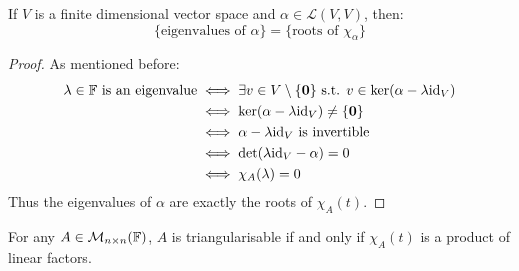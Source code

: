\documentclass[../main.tex]{subfiles}
\begin{document}
\begin{lemma}
  If $V$ is a finite dimensional vector space and $\alpha \in \mathcal{L}(V, V)$, then: \label{eValRoots}
  \[
    \{\text{eigenvalues of $\alpha$}\} = \{\text{roots of $\chi_{\alpha}$}\}
  \]
\end{lemma}
\begin{proof}
  As mentioned before:
  \begin{align*}
    \lambda \in \mathbb{F} \text{ is an eigenvalue} &\iff \exists v \in V \setminus \{\mathbf{\bm{0}}\} \text{ s.t. } v \in \ker(\alpha - \lambda\mathrm{id}_V) \\
                                            &\iff \ker(\alpha - \lambda \mathrm{id}_V) \neq \{\mathbf{\bm{0}}\} \\
                                            &\iff \alpha - \lambda \mathrm{id}_V \text{ is invertible} \\
                                            &\iff \det(\lambda\mathrm{id}_V - \alpha) = 0 \\
                                            &\iff \chi_{A}(\lambda) = 0
  \end{align*}
  Thus the eigenvalues of $\alpha$ are exactly the roots of $\chi_{A}(t)$.
\end{proof}
\begin{proposition}
  For any $A \in \mathcal{M}_{n \times n}(\mathbb{F})$, $A$ is triangularisable if and only if $\chi_{A}(t)$ is a product of linear factors. \label{triLinear}
\end{proposition}
\end{document}
